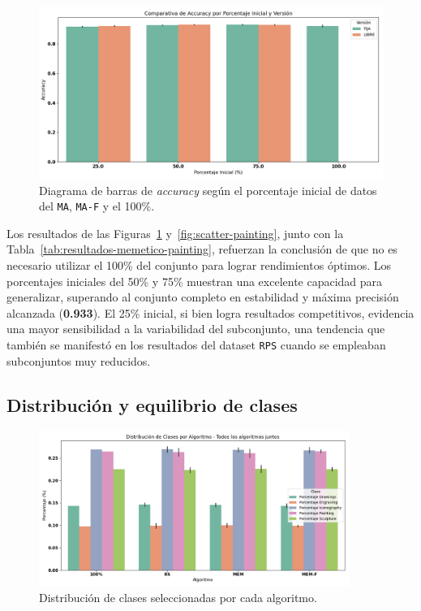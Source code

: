 \begin{figure}[htp]
  \centering
  \includegraphics[width=1\textwidth]{imagenes/evaluaciones/painting/comparacion-por-porcentaje.png}
  \caption{Diagrama de barras de \textit{accuracy} según el porcentaje inicial de datos del \texttt{MA}, \texttt{MA-F} y el 100\%.}
  \label{fig:accuracy_porcentaje_painting}
\end{figure}

Los resultados de las Figuras~\ref{fig:accuracy_porcentaje_painting} y~\ref{fig:scatter-painting}, junto con la Tabla~\ref{tab:resultados-memetico-painting},
refuerzan la conclusión de que no es necesario utilizar el 100\% del conjunto para lograr rendimientos óptimos.
Los porcentajes iniciales del 50\% y 75\% muestran una excelente capacidad para generalizar,
superando al conjunto completo en estabilidad y máxima precisión alcanzada (\textbf{0.933}).
El 25\% inicial, si bien logra resultados competitivos, evidencia una mayor sensibilidad a la variabilidad del subconjunto,
una tendencia que también se manifestó en los resultados del dataset \texttt{RPS} cuando se empleaban subconjuntos muy reducidos.


\subsection{Distribución y equilibrio de clases}

\begin{figure}[htp]
  \centering
  \includegraphics[width=0.9\textwidth]{imagenes/evaluaciones/painting/balance-de-clases-por-algoritmo.png}
  \caption{Distribución de clases seleccionadas por cada algoritmo.}
  \label{fig:balance_clases_painting}
\end{figure}

